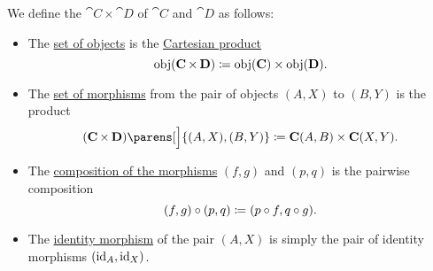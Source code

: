 



\begin{definition}\label{def:product_category}
  We define the  \( \cat{C} \times \cat{D} \) of \( \cat{C} \) and \( \cat{D} \) as follows:

  \begin{itemize}
    \item The \hyperref[def:category/objects]{set of objects} is the \hyperref[def:cartesian_product]{Cartesian product}
    \begin{equation}\label{eq:def:product_category/objects}
      \operatorname{obj}(\operatorname{\mathbf{C}} \times \operatorname{\mathbf{D}}) \coloneqq \operatorname{obj}(\operatorname{\mathbf{C}}) \times \operatorname{obj}(\operatorname{\mathbf{D}}).
    \end{equation}

    \item The \hyperref[def:category/morphisms]{set of morphisms} from the pair of objects \( (A, X) \) to \( (B, Y) \) is the product
    \begin{equation}\label{eq:def:product_category/morphisms}
      (\cat{C} \times \cat{D})\parens[\Big]{ (A, X), (B, Y) } \coloneqq \cat{C}(A, B) \times \cat{C}(X, Y).
    \end{equation}

    \item The \hyperref[def:category/composition]{composition of the morphisms} \( (f, g) \) and \( (p, q) \) is the pairwise composition
    \begin{equation}\label{eq:def:product_category/composition}
      (f, g) \bincirc (p, q) \coloneqq (p \bincirc f, q \bincirc g).
    \end{equation}

    \item The \hyperref[def:category/identity]{identity morphism} of the pair \( (A, X) \) is simply the pair of identity morphisms \( (\operatorname{id}_A, \operatorname{id}_X) \).
  \end{itemize}
\end{definition}

